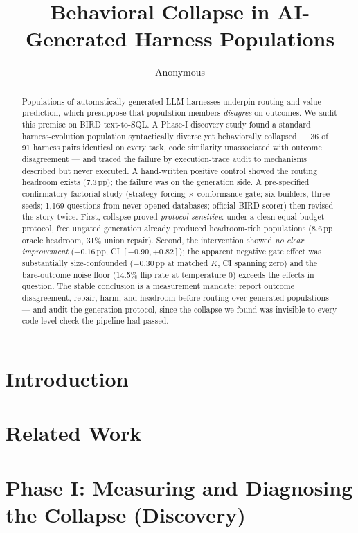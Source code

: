 \documentclass{article}
\title{Behavioral Collapse in AI-Generated Harness Populations}
\author{Anonymous}
\begin{document}
\maketitle

\begin{abstract}
Populations of automatically generated LLM harnesses underpin routing and
value prediction, which presuppose that population members \emph{disagree} on
outcomes. We audit this premise on BIRD text-to-SQL. A Phase-I discovery
study found a standard harness-evolution population syntactically diverse yet
behaviorally collapsed --- 36 of 91 harness pairs identical on every task,
code similarity unassociated with outcome disagreement --- and traced the failure
by execution-trace audit to mechanisms described but never executed. A
hand-written positive control showed the routing headroom exists (7.3\,pp);
the failure was on the generation side. A pre-specified confirmatory
factorial study (strategy forcing $\times$ conformance gate; six builders,
three seeds; 1{,}169 questions from never-opened databases; official BIRD
scorer) then revised the story twice. First, collapse proved
\emph{protocol-sensitive}: under a clean equal-budget protocol, free ungated
generation already produced headroom-rich populations (8.6\,pp oracle
headroom, 31\% union repair). Second, the intervention showed \emph{no clear
improvement} ($-0.16$\,pp, CI $[-0.90, +0.82]$); the apparent negative gate
effect was substantially size-confounded ($-0.30$\,pp at matched $K$, CI
spanning zero) and the bare-outcome noise floor (14.5\% flip rate at
temperature 0) exceeds the effects in question. The stable conclusion is a
measurement mandate: report outcome disagreement, repair, harm, and headroom
before routing over generated populations --- and audit the generation
protocol, since the collapse we found was invisible to every code-level check
the pipeline had passed.
\end{abstract}

\section{Introduction}\label{sec:introduction}


\section{Related Work}\label{sec:related}


\section{Phase I: Measuring and Diagnosing the Collapse (Discovery)}\label{sec:phase1}

\end{document}
